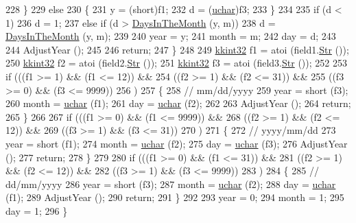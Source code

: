 \begin{DoxyCode}
228     \}
229     \textcolor{keywordflow}{else}
230     \{
231       y = (short)f1;
232       d = (\hyperlink{namespace_k_k_b_ace9969169bf514f9ee6185186949cdf7}{uchar})f3;
233     \}
234 
235     \textcolor{keywordflow}{if}  (d < 1)
236       d = 1;
237     \textcolor{keywordflow}{else} \textcolor{keywordflow}{if}  (d > \hyperlink{class_k_k_b_1_1_date_type_a18f5bb113301526ccef710f5e29190a8}{DaysInTheMonth} (y, m))
238       d = \hyperlink{class_k_k_b_1_1_date_type_a18f5bb113301526ccef710f5e29190a8}{DaysInTheMonth} (y, m);
239 
240     year  = y;
241     month = m;
242     day   = d;
243 
244     AdjustYear ();
245 
246     \textcolor{keywordflow}{return};
247   \}
248 
249   \hyperlink{namespace_k_k_b_a8fa4952cc84fda1de4bec1fbdd8d5b1b}{kkint32} f1 = atoi (field1.\hyperlink{class_k_k_b_1_1_k_k_str_ad574e6c0fe7f6ce1ba3ab0a8ce2fbd52}{Str} ());
250   \hyperlink{namespace_k_k_b_a8fa4952cc84fda1de4bec1fbdd8d5b1b}{kkint32} f2 = atoi (field2.\hyperlink{class_k_k_b_1_1_k_k_str_ad574e6c0fe7f6ce1ba3ab0a8ce2fbd52}{Str} ());
251   \hyperlink{namespace_k_k_b_a8fa4952cc84fda1de4bec1fbdd8d5b1b}{kkint32} f3 = atoi (field3.\hyperlink{class_k_k_b_1_1_k_k_str_ad574e6c0fe7f6ce1ba3ab0a8ce2fbd52}{Str} ());
252 
253   \textcolor{keywordflow}{if}  (((f1 >= 1)  &&  (f1 <= 12))  &&
254        ((f2 >= 1)  &&  (f2 <= 31))  &&
255        ((f3 >= 0)  &&  (f3 <= 9999))
256       )
257   \{
258     \textcolor{comment}{// mm/dd/yyyy}
259     year  = short (f3);
260     month = \hyperlink{namespace_k_k_b_ace9969169bf514f9ee6185186949cdf7}{uchar} (f1);
261     day   = \hyperlink{namespace_k_k_b_ace9969169bf514f9ee6185186949cdf7}{uchar} (f2);
262 
263     AdjustYear ();
264     \textcolor{keywordflow}{return};
265   \}
266 
267   \textcolor{keywordflow}{if}  (((f1 >= 0)  &&  (f1 <= 9999))  &&
268        ((f2 >= 1)  &&  (f2 <= 12))    &&
269        ((f3 >= 1)  &&  (f3 <= 31))
270       )
271   \{
272     \textcolor{comment}{// yyyy/mm/dd}
273     year  = short (f1);
274     month = \hyperlink{namespace_k_k_b_ace9969169bf514f9ee6185186949cdf7}{uchar} (f2);
275     day   = \hyperlink{namespace_k_k_b_ace9969169bf514f9ee6185186949cdf7}{uchar} (f3);
276     AdjustYear ();
277     \textcolor{keywordflow}{return};
278   \}
279 
280   \textcolor{keywordflow}{if}  (((f1 >= 0)  &&  (f1 <= 31))  &&
281        ((f2 >= 1)  &&  (f2 <= 12))    &&
282        ((f3 >= 1)  &&  (f3 <= 9999))
283       )
284   \{
285     \textcolor{comment}{// dd/mm/yyyy}
286     year  = short (f3);
287     month = \hyperlink{namespace_k_k_b_ace9969169bf514f9ee6185186949cdf7}{uchar} (f2);
288     day   = \hyperlink{namespace_k_k_b_ace9969169bf514f9ee6185186949cdf7}{uchar} (f1);
289     AdjustYear ();
290     \textcolor{keywordflow}{return};
291   \}
292 
293   year = 0;
294   month = 1;
295   day = 1;
296 \}
\end{DoxyCode}


